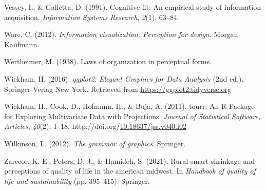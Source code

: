 \documentclass[print]{nuthesis}
\newlength{\cslhangindent}
\newenvironment{CSLReferences}[2]%
{\setlength{\parindent}{0pt}%
\everypar{\setlength{\hangindent}{\cslhangindent}}\ignorespaces}%
{\par}
\begin{document}
\begin{CSLReferences}{1}{0}
\leavevmode{}%
Vessey, I., \& Galletta, D. (1991). Cognitive fit: An empirical study of information acquisition. \emph{Information Systems Research}, \emph{2}(1), 63--84.

\leavevmode{}%
Ware, C. (2012). \emph{Information visualization: Perception for design}. Morgan Kaufmann.

\leavevmode{}%
Wertheimer, M. (1938). Laws of organization in perceptual forms.

\leavevmode{}%
Wickham, H. (2016). \emph{{ggplot2: Elegant Graphics for Data Analysis}} (2nd ed.). Springer-Verlag New York. Retrieved from \url{https://ggplot2.tidyverse.org}

\leavevmode{}%
Wickham, H., Cook, D., Hofmann, H., \& Buja, A. (2011). {tourr: An R Package for Exploring Multivariate Data with Projections}. \emph{Journal of Statistical Software, Articles}, \emph{40}(2), 1--18. http://doi.org/\href{https://doi.org/10.18637/jss.v040.i02}{10.18637/jss.v040.i02}

\leavevmode{}%
Wilkinson, L. (2012). \emph{The grammar of graphics}. Springer.

\leavevmode{}%
Zarecor, K. E., Peters, D. J., \& Hamideh, S. (2021). Rural smart shrinkage and perceptions of quality of life in the american midwest. In \emph{Handbook of quality of life and sustainability} (pp. 395--415). Springer.

\end{CSLReferences}


\backmatter

% 






\end{document}
